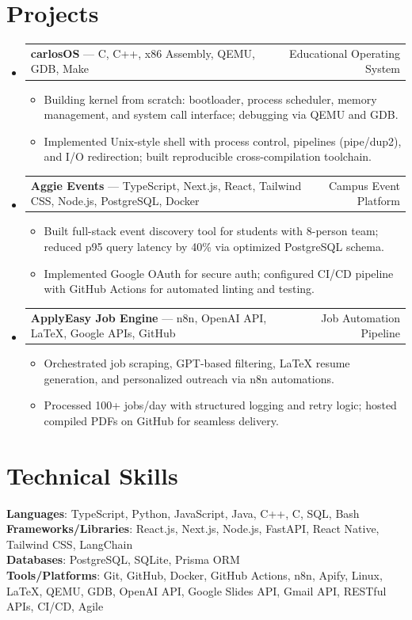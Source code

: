 \documentclass[letterpaper,11pt]{article}
\makeatletter
\newcommand{\resumeItem}[1]{
  \item\small{{#1 \vspace{-2pt}}}
}
\newcommand{\resumeProjectHeading}[2]{
    \item
    \begin{tabular*}{0.97\textwidth}{l@{\extracolsep{\fill}}r}
      \small#1 & #2 \\
    \end{tabular*}\vspace{-7pt}
}
\newcommand{\resumeSubHeadingListStart}{\begin{itemize}[leftmargin=0.15in, label={}]}
\newcommand{\resumeSubHeadingListEnd}{\end{itemize}}
\newcommand{\resumeItemListStart}{\begin{itemize}}
\newcommand{\resumeItemListEnd}{\end{itemize}\vspace{-5pt}}
\makeatother
\begin{document}
\section{Projects}
\resumeSubHeadingListStart
  \resumeProjectHeading
    {\textbf{carlosOS} — C, C++, x86 Assembly, QEMU, GDB, Make}{Educational Operating System}
    \resumeItemListStart
      \resumeItem{Building kernel from scratch: bootloader, process scheduler, memory management, and system call interface; debugging via QEMU and GDB.}
      \resumeItem{Implemented Unix-style shell with process control, pipelines (pipe/dup2), and I/O redirection; built reproducible cross-compilation toolchain.}
    \resumeItemListEnd

  \resumeProjectHeading
    {\textbf{Aggie Events} — TypeScript, Next.js, React, Tailwind CSS, Node.js, PostgreSQL, Docker}{Campus Event Platform}
    \resumeItemListStart
      \resumeItem{Built full-stack event discovery tool for students with 8-person team; reduced p95 query latency by 40\% via optimized PostgreSQL schema.}
      \resumeItem{Implemented Google OAuth for secure auth; configured CI/CD pipeline with GitHub Actions for automated linting and testing.}
    \resumeItemListEnd

  \resumeProjectHeading
    {\textbf{ApplyEasy Job Engine} — n8n, OpenAI API, LaTeX, Google APIs, GitHub}{Job Automation Pipeline}
    \resumeItemListStart
      \resumeItem{Orchestrated job scraping, GPT-based filtering, LaTeX resume generation, and personalized outreach via n8n automations.}
      \resumeItem{Processed 100+ jobs/day with structured logging and retry logic; hosted compiled PDFs on GitHub for seamless delivery.}
    \resumeItemListEnd
\resumeSubHeadingListEnd

\section{Technical Skills}
\begin{itemize}[leftmargin=0.15in, label={}]
  \small{\item{
    \textbf{Languages}{: TypeScript, Python, JavaScript, Java, C++, C, SQL, Bash} \\
    \textbf{Frameworks/Libraries}{: React.js, Next.js, Node.js, FastAPI, React Native, Tailwind CSS, LangChain} \\
    \textbf{Databases}{: PostgreSQL, SQLite, Prisma ORM} \\
    \textbf{Tools/Platforms}{: Git, GitHub, Docker, GitHub Actions, n8n, Apify, Linux, LaTeX, QEMU, GDB, OpenAI API, Google Slides API, Gmail API, RESTful APIs, CI/CD, Agile}
  }}
\end{itemize}
\end{document}
